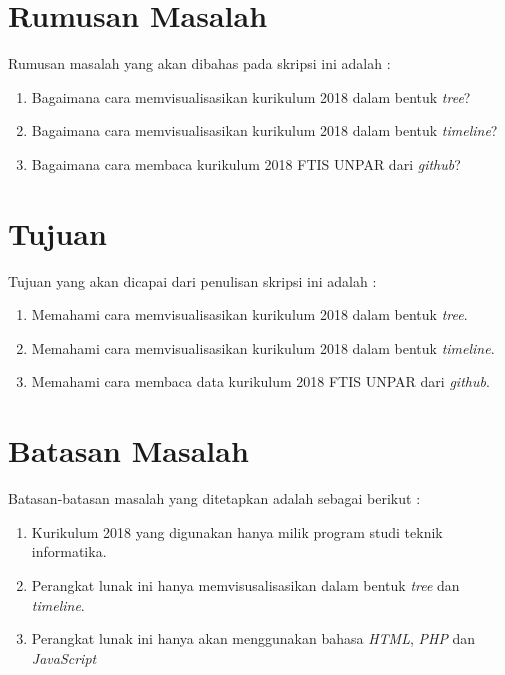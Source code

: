 \newpage
\section{Rumusan Masalah}
\label{sec:rumusan}
Rumusan masalah yang akan dibahas pada skripsi ini adalah : 
\begin{enumerate}
    \item Bagaimana cara memvisualisasikan kurikulum 2018 dalam bentuk \textit{tree}?
    \item Bagaimana cara memvisualisasikan kurikulum 2018 dalam bentuk \textit{timeline}?
    \item Bagaimana cara membaca kurikulum 2018 FTIS UNPAR dari \textit{github}?
\end{enumerate}



\section{Tujuan}
\label{sec:tujuan}
Tujuan yang akan dicapai dari penulisan skripsi ini adalah : 
\begin{enumerate}
    \item Memahami cara memvisualisasikan kurikulum 2018 dalam bentuk \textit{tree}.
    \item Memahami cara memvisualisasikan kurikulum 2018 dalam bentuk \textit{timeline}.
    \item Memahami cara membaca data kurikulum 2018 FTIS UNPAR dari \textit{github}.
\end{enumerate}



\section{Batasan Masalah}
\label{sec:batasan}
Batasan-batasan masalah yang ditetapkan adalah sebagai berikut :
\begin{enumerate}
    \item Kurikulum 2018 yang digunakan hanya milik program studi teknik informatika.
    \item Perangkat lunak ini hanya memvisusalisasikan dalam bentuk \textit{tree} dan \textit{timeline}.
    \item Perangkat lunak ini hanya akan menggunakan bahasa \textit{HTML}, \textit{PHP} dan \textit{JavaScript}
\end{enumerate}



